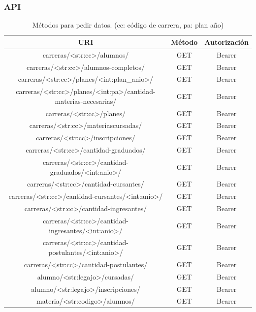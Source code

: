 \subsubsection{API}
\begin{table}[!htbp]
    \centering
    \makegapedcells
    \begin{tabular}{|c|c|c|}
    \hline
    URI & Método & Autorización\\ \hline
    carreras/<str:cc>/alumnos/ & GET & Bearer  \\ \hline
    carreras/<str:cc>/alumnos-completos/ & GET & Bearer  \\ \hline
    carreras/<str:cc>/planes/<int:plan\_anio>/ & GET & Bearer  \\ \hline
    carreras/<str:cc>/planes/<int:pa>/cantidad-materias-necesarias/ & GET & Bearer  \\ \hline
    carreras/<str:cc>/planes/ & GET & Bearer  \\ \hline
    carreras/<str:cc>/materiascursadas/ & GET & Bearer  \\ \hline
    carreras/<str:cc>/inscripciones/ & GET & Bearer  \\ \hline
    carreras/<str:cc>/cantidad-graduados/ & GET & Bearer  \\ \hline
    carreras/<str:cc>/cantidad-graduados/<int:anio>/ & GET & Bearer  \\ \hline
    carreras/<str:cc>/cantidad-cursantes/ & GET & Bearer  \\ \hline
    carreras/<str:cc>/cantidad-cursantes/<int:anio>/ & GET & Bearer  \\ \hline
    carreras/<str:cc>/cantidad-ingresantes/ & GET & Bearer  \\ \hline
    carreras/<str:cc>/cantidad-ingresantes/<int:anio>/ & GET & Bearer  \\ \hline
    carreras/<str:cc>/cantidad-postulantes/<int:anio>/ & GET & Bearer  \\ \hline
    carreras/<str:cc>/cantidad-postulantes/ & GET & Bearer  \\ \hline
    alumno/<str:legajo>/cursadas/ & GET & Bearer  \\ \hline
    alumno/<str:legajo>/inscripciones/ & GET & Bearer  \\ \hline
    materia/<str:codigo>/alumnos/ & GET & Bearer  \\ \hline
    \end{tabular}
    \caption{Métodos para pedir datos. (cc: código de carrera, pa: plan año)}
    \label{tab:tabla_api}
\end{table}

